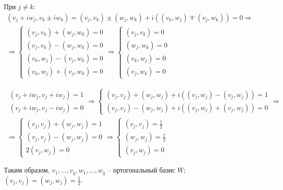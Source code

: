 \documentclass[main]{subfiles}
\begin{document}
При $j \neq k$: 
\begin{gather*}
    (v_j + iw_j, v_k \pm iw_k) = (v_j, v_k) \pm (w_j, w_k) + i((v_k, w_j) \mp (v_j, w_k)) = 0 \Rightarrow \\ \Rightarrow
\left\{ \begin{gathered} 
    (v_j, v_k) + (w_j, w_k) = 0 \\
    (v_j, v_k) - (w_j, w_k) = 0 \\
    (v_k, w_j) - (v_j, w_k) = 0 \\
    (v_k, w_j) + (v_j, w_k) = 0 
\end{gathered} \right. \Rightarrow \left\{ \begin{gathered} 
    (v_j, v_k) = 0 \\
    (w_j, w_k) = 0 \\
    (v_k, w_j) = 0 \\
    (v_j, w_k) = 0 
\end{gathered} \right.
\end{gather*} 

\begin{gather*}
    \begin{gathered} 
        (v_j + iw_j, v_j + iw_j) = 1 \\
        (v_j + iw_j, v_j - iw_j) = 0 
    \end{gathered} \Rightarrow \left\{ \begin{gathered} 
        (v_j, v_j) + (w_j, w_j) + i((v_j, w_j) - (v_j, w_j)) = 1 \\
        (v_j, v_j) - (w_j, w_j) + i((v_j, w_j) + (v_j, w_j)) = 0 
    \end{gathered} \right.  \Rightarrow \\
    \Rightarrow 
    \left \{ 
        \begin{gathered} 
        (v_j, v_j) + (w_j, w_j) = 1 \\
        (v_j, v_j) - (w_j, w_j) = 0 \\
        2(v_j, w_j) = 0
    \end{gathered} \right. 
    \Rightarrow 
    \left \{ 
        \begin{gathered} 
        (v_j, v_j) = \frac{1}{2} \\
        (w_j, w_j) = \frac{1}{2} \\
        (v_j, w_j) = 0
    \end{gathered} \right. 
\end{gather*}

Таким образом, $v_1, \ldots, v_q, w_1, \ldots, w_q$ -- ортогональный базис $W$; $(v_j, v_j) = (w_j, w_j) = \frac{1}{2}$.
\end{document}
